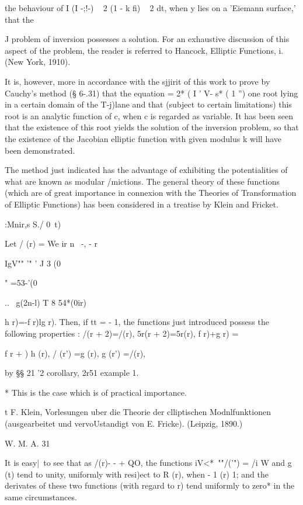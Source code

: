 the behaviour of I (I -;!-) ~ 2 (1 - k fi) ~ 2 dt, when y lies on a
'Eiemann surface,' that the

J problem of inversion possesses a solution. For an exhaustive
discussion of this aspect of the problem, the reader is referred to
Hancock, Elliptic Functions, i. (New York, 1910).

It is, however, more in accordance with the sjjirit of this work to
prove by Cauchy's method (§ 6-.31) that the equation = 2* ( I ' V- s*
( 1 '') one root lying in a certain domain of the T-j)lane and that
(subject to certain limitations) this root is an analytic function of
c, when c is regarded as variable. It has been seen that the existence
of this root yields the solution of the inversion problem, so that the
existence of the Jacobian elliptic function with given modulus k will
have been demonstrated.

The method just indicated has the advantage of exhibiting the
potentialities of what are known as modular /mictions. The general
theory of these functions (which are of great importance in connexion
with the Theories of Transformation of Elliptic Functions) has been
considered in a treatise by Klein and Fricket.

:Mnir,s S./ 0\ t)

Let / (r) = We ir n \ -, - r \

IgV"" '" ' J 3 (0

" =53-'(0

.. \ g(2n-l) T 8 54*(0ir)

h r)=-f r)lg r). Then, if tt = - 1, the functions just introduced
possess the following properties : /(r + 2)=/(r), 5r(r + 2)=5r(r), f
r)+g r) = \,

f r + ) h (r), / (r') =g (r), g (r') =/(r),

by §§ 21 '2 corollary, 2r51 example 1.

* This is the case which is of practical importance.

t F. Klein, Vorlesungen uber die Theorie der clliptischen
Modnlfunktionen (ausgearbeitet und vervoUstandigt von E. Fricke).
(Leipzig, 1890.)

W. M. A. 31

%
%

It is easy|\ to see that as /(r)- - + QO, the functions iV<*~""/('")
= /i W and g (t) tend to unity, uniformly with resi)ect to R (r), when
- 1 (r) 1; and the derivates of these two functions (with regard to
r) tend uniformly to zero* in the same circumstances.

